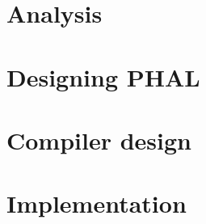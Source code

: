 %
%
%
%
% 


\pagestyle{empty} %



\cleardoublepage
{}
\pagestyle{fancy} %
\tableofcontents

\cleardoublepage

\part{Analysis}

\part{Designing PHAL}


\part{Compiler design}






\part{Implementation}







